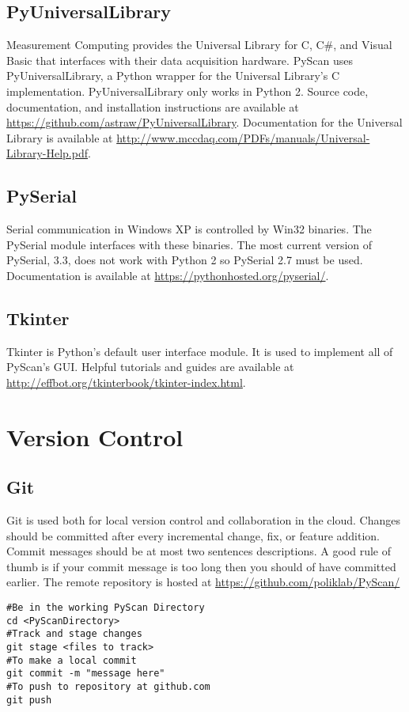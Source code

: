 \documentclass[11pt]{article}
\begin{document}
\subsection{PyUniversalLibrary}
Measurement Computing provides the Universal Library for  C, C\#, and Visual Basic that interfaces with their data acquisition hardware. PyScan uses PyUniversalLibrary, a Python wrapper for the Universal Library's C implementation. PyUniversalLibrary only works in Python 2. Source code, documentation, and installation instructions are available at \url{https://github.com/astraw/PyUniversalLibrary}. Documentation for the Universal Library is available at \url{http://www.mccdaq.com/PDFs/manuals/Universal-Library-Help.pdf}. \subsection{PySerial}
Serial communication in Windows XP is controlled by Win32 binaries. The PySerial module interfaces with these binaries. The most current version of PySerial, 3.3, does not work with Python 2 so PySerial 2.7 must be used. 
\\ Documentation is available at \url{https://pythonhosted.org/pyserial/}.
\subsection{Tkinter}
Tkinter is Python's default user interface module. It is used to implement all of PyScan's GUI. Helpful tutorials and guides are available at \url{http://effbot.org/tkinterbook/tkinter-index.html}.  
\section{Version Control}
\subsection{Git}
Git is used both for local version control and collaboration in the cloud. Changes should be committed after every incremental change, fix, or feature addition. Commit messages should be at most two sentences descriptions. A good rule of thumb is if your commit message is too long then you should of have committed earlier. The remote repository is hosted at \url{https://github.com/poliklab/PyScan/}
\begin{lstlisting}
#Be in the working PyScan Directory 
cd <PyScanDirectory>
#Track and stage changes
git stage <files to track>
#To make a local commit 
git commit -m "message here"
#To push to repository at github.com
git push
\end{lstlisting}
\end{document}

